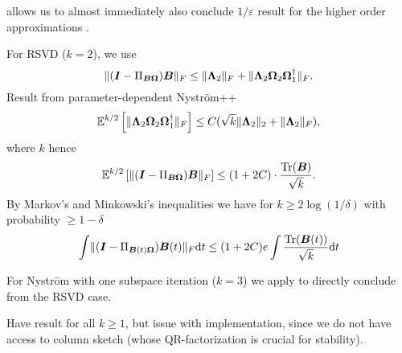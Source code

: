  allows us to almost immediately
also conclude $1/\varepsilon$ result for the higher order approximations
.

For RSVD ($k=2$), we use \cite[Theorem~9.1]{halko2011finding}
\begin{equation}
    \lVert (\boldsymbol{I} - \Pi_{\boldsymbol{B}\boldsymbol{\Omega}}) \boldsymbol{B} \rVert _F \leq \lVert \boldsymbol{\Lambda}_2 \rVert _F + \lVert \boldsymbol{\Lambda}_2 \boldsymbol{\Omega}_2 \boldsymbol{\Omega}_1^{\dagger} \rVert _F.
\end{equation}
Result from parameter-dependent Nyström++ 
\begin{equation}
    \mathbb{E}^{k/2} \left[ \lVert \mtx{\Lambda}_2 \mtx{\Omega}_2 \mtx{\Omega}_1^{\dagger} \rVert _F \right] \leq C(\sqrt{k} \lVert \mtx{\Lambda}_2 \rVert _2 + \lVert \mtx{\Lambda}_2 \rVert _F),%
\end{equation}
where $k$ hence
\begin{equation}
    \mathbb{E}^{k/2} \left[ \lVert (\boldsymbol{I} - \Pi_{\boldsymbol{B}\boldsymbol{\Omega}}) \boldsymbol{B} \rVert _F \right]
    \leq (1 + 2C) \cdot \frac{\operatorname{Tr}(\boldsymbol{B})}{\sqrt{k}}.
\end{equation}
By Markov's and Minkowski's inequalities we have for $k \geq 2 \log(1/\delta)$ with probability $\geq 1 - \delta$
\begin{equation}
    \int \lVert  (\boldsymbol{I} - \Pi_{\boldsymbol{B}(t)\boldsymbol{\Omega}}) \boldsymbol{B}(t) \rVert _F \mathrm{d}t \leq (1 + 2C) e \int \frac{\operatorname{Tr}(\boldsymbol{B}(t))}{\sqrt{k}} \mathrm{d}t
\end{equation}

For Nystr\"om with one subspace iteration ($k=3$) we apply \cite[Lemma~5.2]{tropp2023randomized}
to directly conclude from the RSVD case.

Have result for all $k \geq 1$, but issue with implementation, since we do not
have access to column sketch (whose QR-factorization is crucial for stability).

